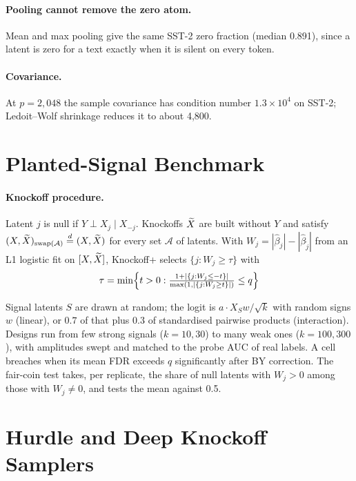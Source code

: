 \paragraph{Pooling cannot remove the zero atom.} Mean and max pooling give the same SST-2 zero fraction (median 0.891), since
a latent is zero for a text exactly when it is silent on every token.

\paragraph{Covariance.} At $p = 2{,}048$ the sample covariance has condition number $1.3\times10^4$ on SST-2; Ledoit--Wolf
shrinkage \citep{ledoit2004} reduces it to about 4,800.

\section{Planted-Signal Benchmark}
\label{app:planted}

\paragraph{Knockoff procedure.} Latent $j$ is null if $Y \perp X_j \mid X_{-j}$. Knockoffs $\widetilde{X}$ are built
without $Y$ and satisfy $(X,\widetilde{X})_{\mathrm{swap}(\mathcal{A})} \overset{d}{=} (X,\widetilde{X})$ for every set $\mathcal{A}$ of latents. With
$W_j = |\hat\beta_j| - |\hat\beta_{\tilde j}|$ from an L1 logistic fit on $[X,\widetilde{X}]$, Knockoff+ selects
$\{j : W_j \ge \tau\}$ with
\begin{equation}
\tau = \min\Bigl\{t>0 : \tfrac{1 + |\{j : W_j \le -t\}|}{\max(1, |\{j: W_j \ge t\}|)} \le q\Bigr\}
\end{equation}

Signal latents $S$ are drawn at random; the logit is $a \cdot X_S w / \sqrt{k}$ with random signs $w$ (linear), or $0.7$ of
that plus $0.3$ of standardised pairwise products (interaction). Designs run from few strong signals ($k = 10, 30$) to many weak
ones ($k = 100, 300$), with amplitudes swept and matched to the probe AUC of real labels. A cell breaches when its mean FDR
exceeds $q$ significantly after BY correction. The fair-coin test takes, per replicate, the share of null latents with $W_j > 0$
among those with $W_j \ne 0$, and tests the mean against 0.5.

\section{Hurdle and Deep Knockoff Samplers}
\label{app:samplers}

